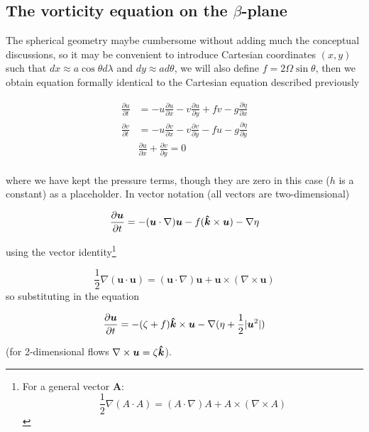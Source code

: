 \subsection{\texorpdfstring{The vorticity equation on the
		\(\beta\)-plane}{The vorticity equation on the \textbackslash beta-plane}}\label{the-vorticity-equation-on-the-beta-plane}

The spherical geometry maybe cumbersome without adding much the
conceptual discussions, so it may be convenient to introduce Cartesian
coordinates \((x,y)\) such that \(dx \approx a \cos\theta d \lambda\)
and \(dy \approx a d\theta\), we will also define
\(f= 2\Omega \sin\theta\), then we obtain equation formally identical to
the Cartesian equation described previously

\[\begin{aligned}
		\frac{\partial u}{\partial t} & = -u \frac{\partial u}{\partial x} -v \frac{\partial u}{\partial y} + f v -g\frac{\partial \eta}{\partial x} \\
		\frac{\partial v}{\partial t} & = -u \frac{\partial v}{\partial x} -v \frac{\partial v}{\partial y} - f u -g\frac{\partial \eta}{\partial y} \\
		                              & \frac{\partial u}{\partial x}+\frac{\partial v}{\partial y} = 0                                              \\
	\end{aligned}\]

where we have kept the pressure terms, though they are zero in this case
($h$ is a constant) as a placeholder. In vector notation (all vectors are
two-dimensional)

\[\frac{\partial \bm{u}}{\partial t} = - (\bm{u} \cdot \nabla)\bm{u} - f(\bm{\hat{k}}\times \bm{u}) - \nabla \eta\]

using the vector identity\footnote{For a general vector $\bm{A}$: \[\frac{1}{2}\nabla(A\cdot A) = (A \cdot\nabla)A + A\times(\nabla\times A)\]}


\[\frac{1}{2}\nabla(\bm{u}\cdot \bm{u}) = (\bm{u} \cdot\nabla)\bm{u} + \bm{u}\times(\nabla\times \bm{u})\]
so substituting in the equation

\begin{equation}
	\frac{\partial \bm{u}}{\partial t} = -(\zeta + f) \bm{\hat{k}}\times \bm{u} -\nabla(\eta+\frac{1}{2}|\bm{u}^2|)
	\label{eq.21}
\end{equation}

(for 2-dimensional flows \(\nabla \times \bm{u} = \zeta \bm{\hat{k}}\)).

